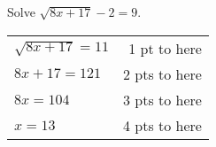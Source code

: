 
{
	Solve $\displaystyle \sqrt{8x+17}-2=9$.
}
{
	\begin{tabular}{l r}
	$\sqrt{8x+17}=11$ & 1 pt to here\\
	$8x+17=121$ & 2 pts to here\\
	$8x=104$ & 3 pts to here\\
	$x=13$ & 4 pts to here \\
	\end{tabular}
}
